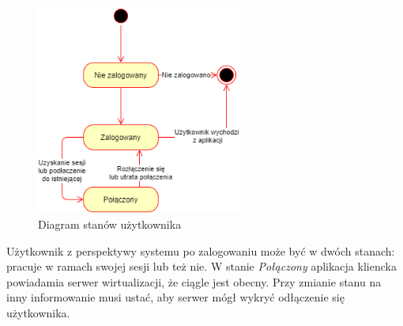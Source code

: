 \documentclass[../opis-rozwiazania.tex]{subfiles}
\begin{document}
\begin{figure}[H]
  \centering
  \includegraphics[width=0.6\textwidth]{../diagrams/state_diagrams/client.png}
  \caption{Diagram stanów użytkownika}
  \label{state_user}
\end{figure}

Użytkownik z perspektywy systemu po zalogowaniu może być w dwóch stanach: pracuje w ramach swojej sesji lub też nie.
W stanie \textit{Połączony} aplikacja kliencka powiadamia serwer wirtualizacji, że ciągle jest obecny.
Przy zmianie stanu na inny informowanie musi ustać, aby serwer mógł wykryć odłączenie się użytkownika.
\end{document}
